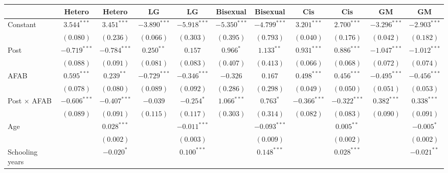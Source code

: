 
\begin{tabular}{l c c c c c c c c c c}
\hline
 & Hetero & Hetero & LG & LG & Bisexual & Bisexual & Cis & Cis & GM & GM \\
\hline
Constant           & $3.544^{***}$  & $3.451^{***}$  & $-3.890^{***}$ & $-5.918^{***}$ & $-5.350^{***}$ & $-4.799^{***}$ & $3.201^{***}$  & $2.700^{***}$  & $-3.296^{***}$ & $-2.903^{***}$ \\
                   & $(0.080)$      & $(0.236)$      & $(0.066)$      & $(0.303)$      & $(0.395)$      & $(0.793)$      & $(0.040)$      & $(0.176)$      & $(0.042)$      & $(0.182)$      \\
Post               & $-0.719^{***}$ & $-0.784^{***}$ & $0.250^{**}$   & $0.157$        & $0.966^{*}$    & $1.133^{**}$   & $0.931^{***}$  & $0.886^{***}$  & $-1.047^{***}$ & $-1.012^{***}$ \\
                   & $(0.088)$      & $(0.091)$      & $(0.081)$      & $(0.083)$      & $(0.407)$      & $(0.413)$      & $(0.066)$      & $(0.068)$      & $(0.072)$      & $(0.074)$      \\
AFAB               & $0.595^{***}$  & $0.239^{**}$   & $-0.729^{***}$ & $-0.346^{***}$ & $-0.326$       & $0.167$        & $0.498^{***}$  & $0.456^{***}$  & $-0.495^{***}$ & $-0.456^{***}$ \\
                   & $(0.078)$      & $(0.080)$      & $(0.089)$      & $(0.092)$      & $(0.286)$      & $(0.298)$      & $(0.049)$      & $(0.050)$      & $(0.051)$      & $(0.053)$      \\
Post $\times$ AFAB & $-0.606^{***}$ & $-0.407^{***}$ & $-0.039$       & $-0.254^{*}$   & $1.066^{***}$  & $0.763^{*}$    & $-0.366^{***}$ & $-0.322^{***}$ & $0.382^{***}$  & $0.338^{***}$  \\
                   & $(0.089)$      & $(0.091)$      & $(0.115)$      & $(0.117)$      & $(0.303)$      & $(0.314)$      & $(0.082)$      & $(0.083)$      & $(0.090)$      & $(0.091)$      \\
Age                &                & $0.028^{***}$  &                & $-0.011^{***}$ &                & $-0.093^{***}$ &                & $0.005^{**}$   &                & $-0.005^{*}$   \\
                   &                & $(0.002)$      &                & $(0.003)$      &                & $(0.009)$      &                & $(0.002)$      &                & $(0.002)$      \\
Schooling years    &                & $-0.020^{*}$   &                & $0.100^{***}$  &                & $0.148^{***}$  &                & $0.028^{***}$  &                & $-0.021^{**}$  \\

\end{tabular}
